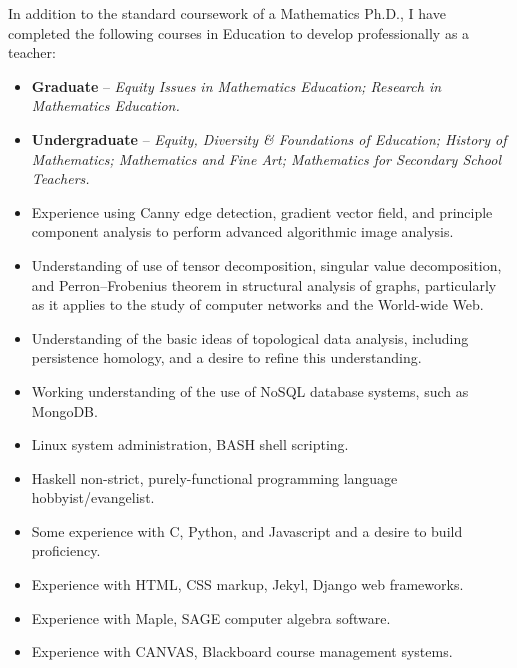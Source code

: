\documentclass[11pt]{article}
\begin{document}
  In addition to the standard coursework of a Mathematics Ph.D., I have
  completed the following courses in Education to develop professionally
  as a teacher:
  \begin{itemize}
    \item{}
      {\bf Graduate} -- {\em Equity Issues in Mathematics Education;
      Research in Mathematics Education.}
    \item{}
      {\bf Undergraduate} -- {\em Equity, Diversity \& Foundations of
        Education; History of Mathematics; Mathematics and Fine Art;
        Mathematics for Secondary School Teachers.}
  \end{itemize}

  \begin{itemize}
    \item{} Experience using Canny edge detection, gradient vector
      field, and principle component analysis to perform advanced
      algorithmic image analysis.
    \item{} Understanding of use of tensor decomposition, singular value
      decomposition, and Perron–Frobenius theorem in structural analysis
      of graphs, particularly as it applies to the study of computer
      networks and the World-wide Web.
    \item{} Understanding of the basic ideas of topological data
      analysis, including persistence homology, and a desire to refine
      this understanding.
    \item{} Working understanding of the use of NoSQL database systems,
      such as MongoDB.
    \item{} Linux system administration, BASH shell scripting.
    \item{} Haskell non-strict, purely-functional programming language
      hobbyist/evangelist.
    \item{} Some experience with C, Python, and Javascript and a desire
      to build proficiency.
    \item{} Experience with HTML, CSS markup,
      Jekyl, Django web frameworks.
    \item{} Experience with Maple, SAGE computer algebra software.
    \item{} Experience with CANVAS, Blackboard course management
      systems.
  \end{itemize}

\newpage
\end{document}
